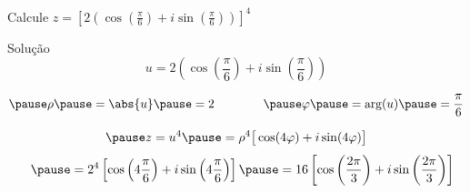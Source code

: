 \begin{question}
  Calcule
  \(
    z = \left[2\left(\cos\left(\frac{\pi}{6}\right) + i\sin\left(\frac{\pi}{6}\right)\right)\right]^4
  \)
\end{question}

\begin{resolution}{Solução}
  \[
    u = 2\left(\cos\left(\frac{\pi}{6}\right) + i\sin\left(\frac{\pi}{6}\right)\right)
  \]

  \[
    \pause \rho
    \pause = \abs{u}
    \pause = 2
    \qquad\qquad
    \pause \varphi
    \pause = \arg(u)
    \pause = \frac{\pi}{6}
  \]

  \[
    \pause
    z = u^4
    \pause
    = \rho^4 \big[\cos(4\varphi) + i\sin(4\varphi)\big]
  \]
  \[
    \hphantom{z^4}
    \pause
    = 2^4 \left[\cos\left(4\frac{\pi}{6}\right) + i\sin\left(4\frac{\pi}{6}\right)\right]
    \pause
    = 16  \left[\cos\left(\frac{2\pi}{3}\right) + i\sin\left(\frac{2\pi}{3}\right)\right]
  \]
\end{resolution}

